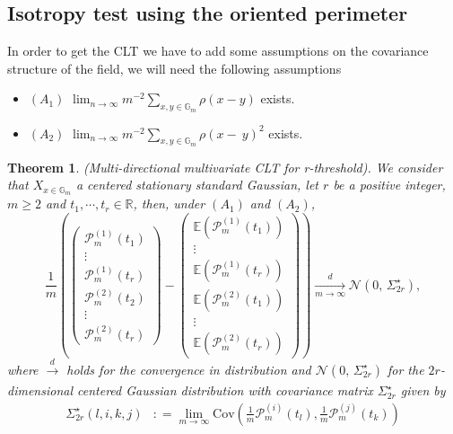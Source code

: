 \documentclass[12pt]{article}
\theoremstyle{Theorem}
\newtheorem{Theorem}{Theorem}[section]
\begin{document}
\subsection{Isotropy test using the oriented perimeter}
In order to get the CLT we have to add some assumptions on the covariance structure of the field, we will need the following  assumptions 
\begin{itemize}
\item \textbf{$(A_{1})$} $\lim_{n \to \infty} m^{-2}\sum_{x, y \in \mathbb{G}_{m}}\rho(x-y)$ exists.
\item \textbf{$(A_{2})$} $\lim_{n \to \infty} m^{-2}\sum_{x, y \in \mathbb{G}_{m}}\rho(x-~y)^{2}$ exists.
\end{itemize} 
\begin{Theorem}\label{TCL}(Multi-directional multivariate CLT for r-threshold). We consider that $X_{x \in \mathbb{G}_{m}}$ a centered stationary standard Gaussian, let $r$ be a positive integer, $m \geq 2$ and $t_{1}, \cdots,t_{r} \in \mathbb{R}$, then, under \textbf{$(A_{1})$} and \textbf{$(A_{2})$},
\begin{equation*}
\frac{1}{m}\left(\begin{pmatrix} \mathcal{P}^{\scriptscriptstyle (1)}_{m}(t_{1}) \\  \vdots \\ \mathcal{P}^{\scriptscriptstyle (1)}_{m}(t_{r}) \\ \mathcal{P}^{\scriptscriptstyle (2)}_{m}(t_{2}) \\  \vdots \\ \mathcal{P}^{\scriptscriptstyle (2)}_{m}(t_{r})  \end{pmatrix} - \begin{pmatrix} \mathbb{E}(\mathcal{P}^{\scriptscriptstyle (1)}_{m}(t_{1}))  \\ \vdots \\ \mathbb{E}(\mathcal{P}^{\scriptscriptstyle (1)}_{m}(t_{r}))\\\mathbb{E}(\mathcal{P}^{\scriptscriptstyle (2)}_{m}(t_{1})) \\ \vdots \\ \mathbb{E}(\mathcal{P}^{\scriptscriptstyle (2)}_{m}(t_{r})) \end{pmatrix}\right) \xrightarrow[m \to \infty]{d} \mathcal{N}\left(0,\,\Sigma_{2r}^{\star}\right),
\end{equation*}
where $\xrightarrow[]{d}$ holds for the convergence in distribution and $\mathcal{N}\left(0,\,\Sigma_{2r}^{\star}\right)$ for the $2r$-dimensional centered Gaussian distribution with covariance matrix $\Sigma^\star_{2r}$ given by
\begin{align*}
\Sigma^{\star}_{2r}(l,i,k,j) & : = \lim_{m \to \infty}\text{Cov}\left(\frac{1}{m}\mathcal{P}^{\scriptscriptstyle (i)}_{m}(t_{l}),  \frac{1}{m}\mathcal{P}^{\scriptscriptstyle (j)}_{m}(t_{k}) \right)
\end{align*}
\end{Theorem}
\end{document}
